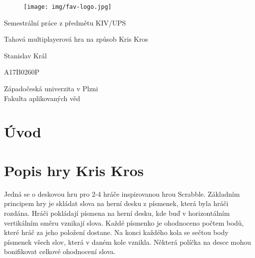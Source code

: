 \documentclass[12pt, a4paper]{article}
\let\oldsection\section
\renewcommand\section{\clearpage\oldsection}
\begin{document}
	\renewcommand{\lstlistingname}{Ukázka kódu}
	\renewcommand{\lstlistlistingname}{Seznam ukázek kódu}
    \begin{titlepage}

       \centering

       \vspace*{\baselineskip}

       \begin{figure}[H]
          \centering
          \texttt{[image: img/fav-logo.jpg]}
       \end{figure}

       \vspace*{1\baselineskip}
       {\sc Semestrální práce z předmětu KIV/UPS}
       \vspace*{1\baselineskip}

       \vspace{0.75\baselineskip}

       {\LARGE\sc Tahová multiplayerová hra na způsob Kris Kros\\}

       \vspace{4\baselineskip}
       
		\vspace{0.5\baselineskip}

       
       {\sc\Large Stanislav Král \\}

       \vspace{0.5\baselineskip}

       {A17B0260P}

       \vfill

       {\sc Západočeská univerzita v Plzni\\
       Fakulta aplikovaných věd}


    \end{titlepage}


    \tableofcontents
    \pagebreak


    
    \section{Úvod}
    \section{Popis hry Kris Kros}
    Jedná se o deskovou hru pro 2-4 hráče inspirovanou hrou Scrabble. Základním principem hry je skládat slova na herní desku z písmenek, která byla hráči rozdána. Hráči pokládají písmena na herní desku, kde buď v horizontálním vertikálním směru vznikají slova. Každé písmenko je ohodnoceno počtem bodů, které hráč za jeho položení dostane. Na konci každého kola se sečtou body písmenek všech slov, která v daném kole vznikla. Některá políčka na desce mohou bonifikovat celkové ohodnocení slova.
\end{document}
